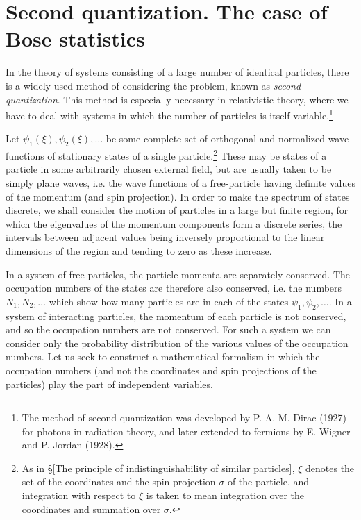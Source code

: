 \section{Second quantization. The case of Bose statistics}\label{Second quantization. The case of Bose statistics}
In the theory of systems consisting of a large number of identical particles, there is a widely used method of considering the problem, known as \textit{second quantization}. This method is especially necessary in relativistic theory, where we have to deal with systems in which the number of particles is itself variable.\footnote{The method of second quantization was developed by P. A. M. Dirac (1927) for photons in radiation theory, and later extended to fermions by E. Wigner and P. Jordan (1928).
}

Let $ \psi_1(\xi), \psi_2(\xi), \dots $ be some complete set of orthogonal and normalized wave functions of stationary states of a single particle.\footnote{As in \S\ref{The principle of indistinguishability of similar particles}, $\xi$ denotes the set of the coordinates and the spin projection $\sigma$ of the particle, and integration with respect to $\xi$ is taken to mean integration over the coordinates and summation over $\sigma$.
} These may be states of a particle in some arbitrarily chosen external field, but are usually taken to be simply plane waves, i.e. the wave functions of a free-particle having definite values of the momentum (and spin projection). In order to make the spectrum of states discrete, we shall consider the motion of particles in a large but finite region, for which the eigenvalues of the momentum components form a discrete series, the intervals between adjacent values being inversely proportional to the linear dimensions of the region and tending to zero as these increase.

In a system of free particles, the particle momenta are separately conserved. The occupation numbers of the states are therefore also conserved, i.e. the numbers $ N_1, N_2, \dots $ which show how many particles are in each of the states $ \psi_1, \psi_2, \dots $. In a system of interacting particles, the momentum of each particle is not conserved, and so the occupation numbers are not conserved. For such a system we can consider only the probability distribution of the various values of the occupation numbers. Let us seek to construct a mathematical formalism in which the occupation numbers (and not the coordinates and spin projections of the particles) play the part of independent variables.


